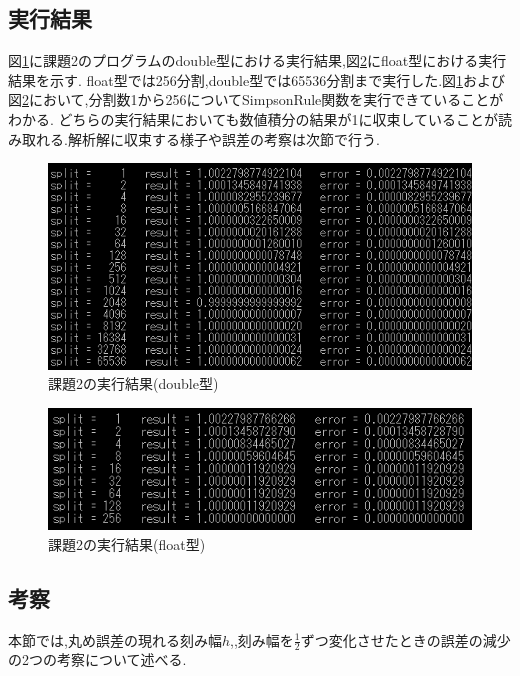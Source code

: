 \documentclass[dvipdfmx]{jarticle}
\begin{document}
    \subsection{実行結果}
    図\ref{kadai2d}に課題2のプログラムのdouble型における実行結果,図\ref{kadai2f}にfloat型における実行結果を示す.
    float型では256分割,double型では65536分割まで実行した.図\ref{kadai2d}および図\ref{kadai2f}において,分割数1から256についてSimpsonRule関数を実行できていることがわかる.
    どちらの実行結果においても数値積分の結果が1に収束していることが読み取れる.解析解に収束する様子や誤差の考察は次節で行う.
    \begin{figure}[H]
      \centering
      \includegraphics[scale=0.9]{kadai2double.png}
      \caption{課題2の実行結果(double型)}
       \label{kadai2d}
      \end{figure}

      \begin{figure}[H]
        \centering
        \includegraphics[scale=0.9]{kadai2float.png}
        \caption{課題2の実行結果(float型)}
         \label{kadai2f}
        \end{figure}

    \subsection{考察}
    本節では,丸め誤差の現れる刻み幅$h$,,刻み幅を$\frac{1}{2}$ずつ変化させたときの誤差の減少の2つの考察について述べる.
\end{document}
